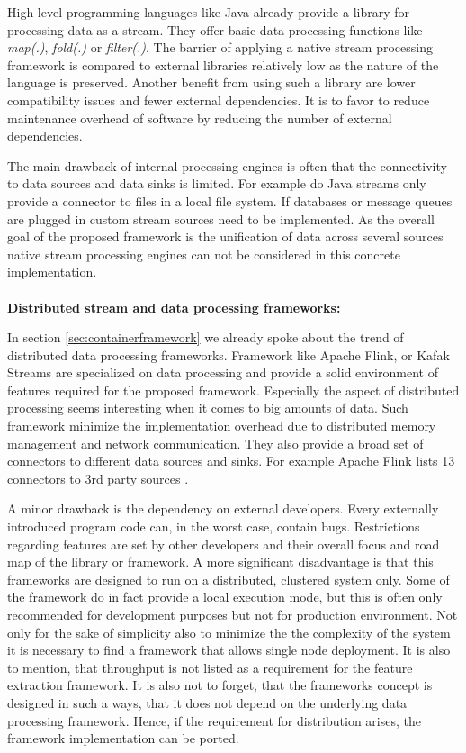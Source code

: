 \noindent High level programming languages like Java already provide a library for processing data as a stream\cite{urma_2017}. They offer basic data processing functions like \textit{map(.)}, \textit{fold(.)} or \textit{filter(.)}. The barrier of applying a native stream processing framework is compared to external libraries relatively low as the nature of the language is preserved. Another benefit from using such a library are lower compatibility issues and fewer external dependencies. It is to favor to reduce maintenance overhead of software by reducing the number of external dependencies. 

The main drawback of internal processing engines is often that the connectivity to data sources and data sinks is limited. For example do Java streams only provide a connector to files in a local file system. If databases or message queues are plugged in custom stream sources need to be implemented. As the overall goal of the proposed framework is the unification of data across several sources native stream processing engines can not be considered in this concrete implementation.
\\\\
\textbf{Distributed stream and data processing frameworks:}

\noindent In section \ref{sec:containerframework} we already spoke about the trend of distributed data processing frameworks. Framework like Apache Flink, or Kafak Streams are specialized on data processing and provide a solid environment of features required for the proposed framework. Especially the aspect of distributed processing seems interesting when it comes to big amounts of data. Such framework minimize the implementation overhead due to distributed memory management and network communication. They also provide a broad set of connectors to different data sources and sinks. For example Apache Flink lists 13 connectors to 3rd party sources \cite{flink_streaming_2017}. 

A minor drawback is the dependency on external developers. Every externally introduced program code can, in the worst case, contain bugs. Restrictions regarding features are set by other developers and their overall focus and road map of the library or framework. A more significant disadvantage is that this frameworks are designed to run on a distributed, clustered system only. Some of the framework do in fact provide a local execution mode, but this is often only recommended for development purposes but not for production environment. Not only for the sake of simplicity also to minimize the the complexity of the system it is necessary to find a framework that allows single node deployment. It is also to mention, that throughput is not listed as a requirement for the feature extraction framework. It is also not to forget, that the frameworks concept is designed in such a ways, that it does not depend on the underlying data processing framework. Hence, if the requirement for distribution arises, the framework implementation can be ported.
\\\\

